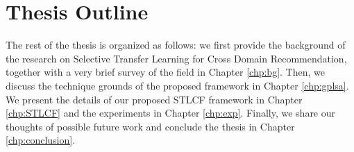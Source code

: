 \hspace{0.1in}
\section{Thesis Outline}

The rest of the thesis is organized as follows: we first provide the background of the research on Selective Transfer Learning for Cross Domain Recommendation, together with a very brief survey of the field in Chapter \ref{chp:bg}. Then, we discuss the technique grounds of the proposed framework in Chapter \ref{chp:gplsa}. We present the details of our proposed STLCF framework in Chapter \ref{chp:STLCF} and the experiments in Chapter \ref{chp:exp}. Finally, we share our thoughts of possible future work and conclude the thesis in Chapter \ref{chp:conclusion}.



